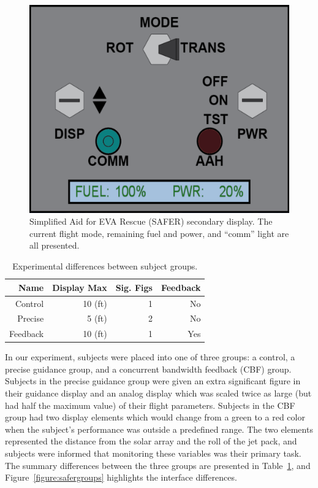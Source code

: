 \begin{figure}[tb!]
    \begin{center}
        \includegraphics[width=0.8\linewidth]{figures/Introduction/SAFER_Panel.png}
        \caption[Simplified Aid for EVA Rescue (SAFER) secondary display]{Simplified Aid for EVA Rescue (SAFER) secondary display. The current flight mode, remaining fuel and power, and ``comm'' light are all presented.}
        \label{figure:saferpanel}
    \end{center}
\end{figure}

\begin{table}[tb!]
    \centering
    \begin{tabular}{rrrr}
        \toprule
        Name     & Display Max & Sig. Figs & Feedback \\
        \midrule
        Control  & 10 (ft)     & 1         & No       \\
        Precise  & 5 (ft)      & 2         & No       \\
        Feedback & 10 (ft)     & 1         & Yes      \\
        \bottomrule
    \end{tabular}
    \caption[Experimental differences between subject groups]{Experimental differences between subject groups.}
    \label{tab:group_diffs}
\end{table}

In our experiment, subjects were placed into one of three groups: a control, a precise guidance group, and a concurrent bandwidth feedback (CBF) group.
Subjects in the precise guidance group were given an extra significant figure in their guidance display and an analog display which was scaled twice as large (but had half the maximum value) of their flight parameters.
Subjects in the CBF group had two display elements which would change from a green to a red color when the subject's performance was outside a predefined range.
The two elements represented the distance from the solar array and the roll of the jet pack, and subjects were informed that monitoring these variables was their primary task.
The summary differences between the three groups are presented in Table~\ref{tab:group_diffs}, and Figure~\ref{figure:safergroups} highlights the interface differences.

